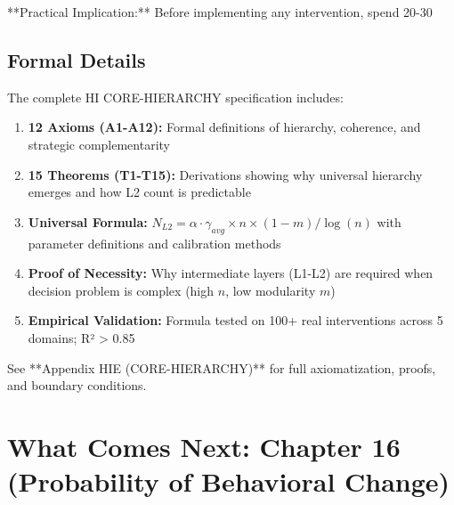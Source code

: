 \documentclass[11pt, a4paper]{article}
\begin{document}
**Practical Implication:** Before implementing any intervention, spend 20-30%

\subsection{Formal Details}

The complete HI CORE-HIERARCHY specification includes:

\begin{enumerate}[nosep]
    \item \textbf{12 Axioms (A1-A12):} Formal definitions of hierarchy, coherence, and strategic complementarity
    \item \textbf{15 Theorems (T1-T15):} Derivations showing why universal hierarchy emerges and how L2 count is predictable
    \item \textbf{Universal Formula:} $N_{L2} = \alpha \cdot \gamma_{avg} \times n \times (1-m) / \log(n)$ with parameter definitions and calibration methods
    \item \textbf{Proof of Necessity:} Why intermediate layers (L1-L2) are required when decision problem is complex (high $n$, low modularity $m$)
    \item \textbf{Empirical Validation:} Formula tested on 100+ real interventions across 5 domains; R² > 0.85
\end{enumerate}

See **Appendix HIE (CORE-HIERARCHY)** for full axiomatization, proofs, and boundary conditions.


\section{What Comes Next: Chapter 16 (Probability of Behavioral Change)}\label{sec:ch15-what-next}
\end{document}
